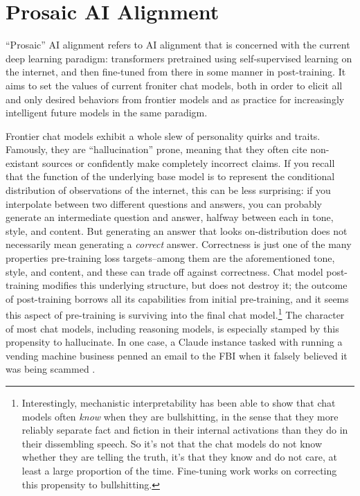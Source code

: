 \section{Prosaic AI Alignment}
``Prosaic'' AI alignment refers to AI alignment that is concerned with the
current deep learning paradigm: transformers pretrained using self-supervised
learning on the internet, and then fine-tuned from there in some manner in
post-training. It aims to set the values of current froniter chat models, both
in order to elicit all and only desired behaviors from frontier models and as
practice for increasingly intelligent future models in the same paradigm.

Frontier chat models exhibit a whole slew of personality quirks and traits.
Famously, they are ``hallucination'' prone, meaning that they often cite
non-existant sources or confidently make completely incorrect claims. If you
recall that the function of the underlying base model is to represent the
conditional distribution of observations of the internet, this can be less
surprising: if you interpolate between two different questions and answers, you
can probably generate an intermediate question and answer, halfway between each
in tone, style, and content. But generating an answer that looks
on-distribution does not necessarily mean generating a \emph{correct} answer.
Correctness is just one of the many properties pre-training loss targets--among
them are the aforementioned tone, style, and content, and these can trade off
against correctness. Chat model post-training modifies this underlying
structure, but does not destroy it; the outcome of post-training borrows all
its capabilities from initial pre-training, and it seems this aspect of
pre-training is surviving into the final chat model.\footnote{Interestingly,
mechanistic interpretability has been able to show that chat models often
\emph{know} when they are bullshitting, in the sense that they more reliably
separate fact and fiction in their internal activations than they do in their
dissembling speech. So it's not that the chat models do not know whether they
are telling the truth, it's that they know and do not care, at least a large
proportion of the time. Fine-tuning work works on correcting this propensity to
bullshitting.} The character of most chat models, including reasoning models,
is especially stamped by this propensity to hallucinate. In one case, a Claude
instance tasked with running a vending machine business penned an email to the
FBI when it falsely believed it was being scammed \cite{backlund2025vending}.
